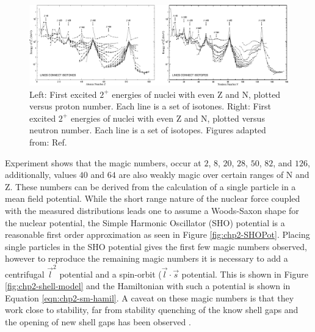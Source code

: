 \begin{figure}[h!]
\centerline{\includegraphics[width=\textwidth]{./img/c2/2_plus_en.eps}}
	\caption{Left: First excited $2^+$ energies of nuclei with even Z and N, plotted versus proton number. Each line is a set of isotones. Right: First excited $2^+$ energies of nuclei with even Z and N, plotted versus neutron number. Each line is a set of isotopes. Figures adapted from: Ref.\cite{RamanTwoPlus}\label{fig:chp2-two-plus-energies}}
\end{figure}

Experiment shows that the magic numbers, occur at $2$, $8$, $20$, $28$, $50$, $82$, and $126$, additionally, values $40$ and $64$ are also weakly magic over certain ranges of N and Z. These numbers can be derived from the calculation of a single particle in a mean field potential. While the short range nature of the nuclear force coupled with the measured distributions leads one to assume a Woods-Saxon shape for the nuclear potential, the Simple Harmonic Oscillator (SHO) potential is a reasonable first order approximation as seen in Figure \ref{fig:chp2-SHOPot}. Placing single particles in the SHO potential gives the first few magic numbers observed, however to reproduce the remaining magic numbers it is necessary to add a centrifugal $\vec{l}^2$ potential and a spin-orbit ($\vec{l}\cdot\vec{s}$ potential. This is shown in Figure \ref{fig:chp2-shell-model} and the Hamiltonian with such a potential is shown in Equation \ref{eqn:chp2-sm-hamil}. A caveat on these magic numbers is that they work close to stability, far from stability quenching of the know shell gaps and the opening of new shell gaps has been observed \cite{changingShells}.


